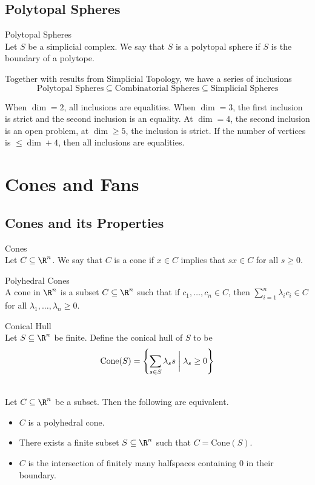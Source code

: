 \documentclass[a4paper]{article}
\begin{document}
\subsection{Polytopal Spheres}
\begin{defn}{Polytopal Spheres}{}\\
Let $S$ be a simplicial complex. We say that $S$ is a polytopal sphere if $S$ is the boundary of a polytope. 
\end{defn}

Together with results from Simplicial Topology, we have a series of inclusions $$\text{Polytopal Spheres}\subseteq\text{Combinatorial Spheres}\subseteq\text{Simplicial Spheres}$$

When $\dim=2$, all inclusions are equalities. When $\dim=3$, the first inclusion is strict and the second inclusion is an equality. At $\dim=4$, the second inclusion is an open problem, at $\dim\geq 5$, the inclusion is strict. If the number of vertices is $\leq\dim+4$, then all inclusions are equalities. 

\pagebreak
\section{Cones and Fans}
\subsection{Cones and its Properties}
\begin{defn}{Cones}{}\\
Let $C\subseteq\R^n$. We say that $C$ is a cone if $x\in C$ implies that $sx\in C$ for all $s\geq 0$. 
\end{defn}

\begin{defn}{Polyhedral Cones}{}\\
A cone in $\R^n$ is a subset $C\subseteq\R^n$ such that if $c_1,\dots,c_n\in C$, then $\sum_{i=1}^n\lambda_ic_i\in C$ for all $\lambda_1,\dots,\lambda_n\geq 0$. 
\end{defn}

\begin{defn}{Conical Hull}{}\\
Let $S\subseteq\R^n$ be finite. Define the conical hull of $S$ to be $$\text{Cone}(S)=\left\{\sum_{s\in S}\lambda_ss\;\bigg{|}\;\lambda_s\geq 0\right\}$$
\end{defn}

\begin{prp}{}{}\\
Let $C\subseteq\R^n$ be a subset. Then the following are equivalent. 
\begin{itemize}
\item $C$ is a polyhedral cone. 
\item There exists a finite subset $S\subseteq\R^n$ such that $C=\text{Cone}(S)$. 
\item $C$ is the intersection of finitely many halfspaces containing $0$ in their boundary. 
\end{itemize}
\end{prp}
\end{document}

